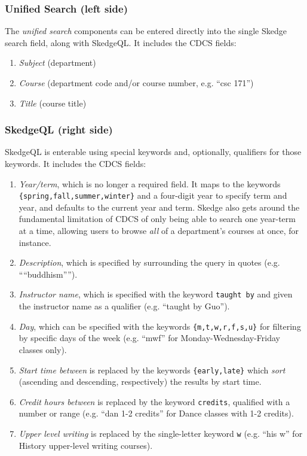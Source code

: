 \subsubsection{Unified Search (left side)}

The \emph{unified search} components can be entered directly into the single Skedge search field, along with SkedgeQL. It includes the CDCS fields:

\begin{enumerate}
  \item \emph{Subject} (department)
  \item \emph{Course} (department code and/or course number, e.g. ``csc 171'')
  \item \emph{Title} (course title)
\end{enumerate}

\subsubsection{SkedgeQL (right side)}

SkedgeQL is enterable using special keywords and, optionally, qualifiers for those keywords. It includes the CDCS fields:

\begin{enumerate}
  \item \emph{Year/term}, which is no longer a required field. It maps to the keywords {\tt \{spring,fall,summer,winter\}} and a four-digit year to specify term and year, and defaults to the current year and term. Skedge also gets around the fundamental limitation of CDCS of only being able to search one year-term at a time, allowing users to browse \emph{all} of a department's courses at once, for instance.

  \item \emph{Description}, which is specified by surrounding the query in quotes (e.g. ````buddhism'''').

  \item \emph{Instructor name}, which is specified with the keyword {\tt taught by} and given the instructor name as a qualifier (e.g. ``taught by Guo'').

  \item \emph{Day}, which can be specified with the keywords {\tt \{m,t,w,r,f,s,u\}} for filtering by specific days of the week (e.g. ``mwf'' for Monday-Wednesday-Friday classes only).

  \item \emph{Start time between} is replaced by the keywords {\tt \{early,late\}} which \emph{sort} (ascending and descending, respectively) the results by start time.

  \item \emph{Credit hours between} is replaced by the keyword {\tt credits}, qualified with a number or range (e.g. ``dan 1-2 credits'' for Dance classes with 1-2 credits).

  \item \emph{Upper level writing} is replaced by the single-letter keyword {\tt w} (e.g. ``his w'' for History upper-level writing courses).
\end{enumerate}

